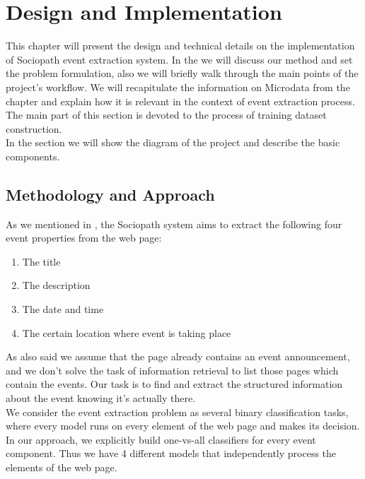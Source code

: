 \chapter{Design and Implementation}
\label{chap:design}
This chapter will present the design and technical details on the implementation of Sociopath event extraction system. In the  we will discuss our method and set the problem formulation, also we will briefly walk through the main points of the project's workflow. We will recapitulate the information on Microdata from the chapter and explain how it is relevant in the context of event extraction process. The main part of this section is devoted to the process of training dataset construction. \\

In the section  we will show the diagram of the project and describe the basic components. 

\section{Methodology and Approach}
\label{sec:method}
As we mentioned in , the Sociopath system aims to extract the following four event properties from the web page: 

\begin{enumerate}
    \item The title
    \item The description
    \item The date and time
    \item The certain location where event is taking place
\end{enumerate}

As also said we assume that the page already contains an event announcement, and we don't solve the task of information retrieval to list those pages which contain the events. Our task is to find and extract the structured information about the event knowing it's actually there.\\

We consider the event extraction problem as several binary classification tasks, where every model runs on every element of the web page and makes its decision. In our approach, we explicitly build one-vs-all classifiers for every event component. Thus we have 4 different models that independently process the elements of the web page. \\

